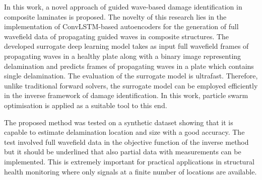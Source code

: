 In this work, a novel approach of guided wave-based damage identification in composite laminates is proposed. 
The novelty of this research lies in the implementation of ConvLSTM-based autoencoders for the generation of full wavefield data of propagating guided waves in composite structures.
The developed surrogate deep learning model takes as input full wavefield frames of propagating waves in a healthy plate along with a binary image representing delamination and predicts frames of propagating waves in a plate which contains single delamination.
The evaluation of the surrogate model is ultrafast.
Therefore, unlike traditional forward solvers, the surrogate model can be employed efficiently in the inverse framework of damage identification.
In this work, particle swarm optimisation is applied as a suitable tool to this 
end. 

The proposed method was tested on a synthetic dataset showing that it is capable to estimate delamination location and size with a good accuracy.
The test involved full wavefield data in the objective function of the inverse 
method but it should be underlined that also partial data with measurements can 
be implemented.
This is extremely important for practical applications in structural health 
monitoring where only signals at a finite number of locations are available.